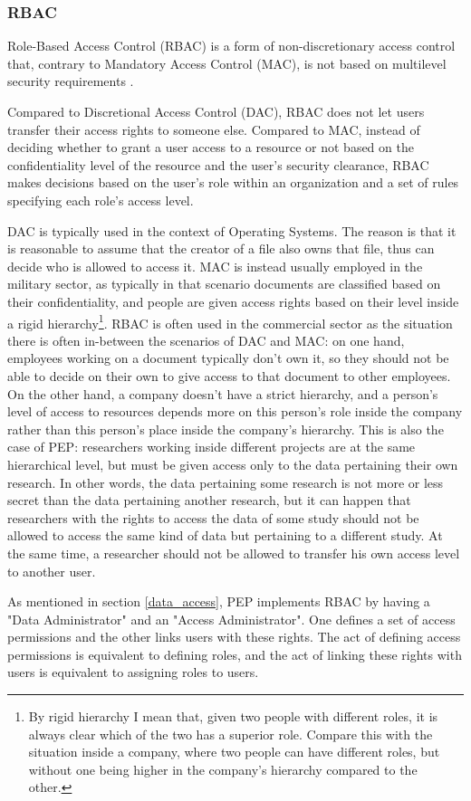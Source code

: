 \documentclass{report}
\begin{document}
\subsubsection{RBAC}
Role-Based Access Control (RBAC) is a form of non-discretionary access control that, contrary to Mandatory Access Control (MAC), is not based on multilevel security requirements \cite{rbac}. \par
Compared to Discretional Access Control (DAC), RBAC does not let users transfer their access rights to someone else. Compared to MAC, instead of deciding whether to grant a user access 
to a resource or not based on the confidentiality level of the resource and the user's security clearance, RBAC makes decisions based on the user's role within an organization and a set 
of rules specifying each role's access level. \par
DAC is typically used in the context of Operating Systems. The reason is that it is reasonable to assume that the creator of a file also owns that file, thus can decide who is
allowed to access it. MAC is instead usually employed in the military sector, as typically in that scenario documents are classified based on their confidentiality, and people are
given access rights based on their level inside a rigid hierarchy\footnote{By rigid hierarchy I mean that, given two people with different roles, it is always clear which of the two 
has a superior role. Compare this with the situation inside a company, where two people can have different roles, but without one being higher in the company's hierarchy compared to
the other.}. RBAC is often used in the commercial sector as the situation there is often in-between the scenarios of DAC and MAC: on one hand, employees working on a document
typically don't own it, so they should not be able to decide on their own to give access to that document to other employees. On the other hand, a company doesn't have a strict
hierarchy, and a person's level of access to resources depends more on this person's role inside the company rather than this person's place inside the company's hierarchy. This is
also the case of PEP: researchers working inside different projects are at the same hierarchical level, but must be given access only to the data pertaining their own research. In
other words, the data pertaining some research is not more or less secret than the data pertaining another research, but it can happen that researchers with the rights to access
the data of some study should not be allowed to access the same kind of data but pertaining to a different study. At the same time, a researcher should not be allowed to transfer his
own access level to another user. \par
As mentioned in section \ref{data_access}, PEP implements RBAC by having a "Data Administrator" and an "Access Administrator". One defines a set of access permissions and the other
links users with these rights. The act of defining access permissions is equivalent to defining roles, and the act of linking these rights with users is equivalent to assigning
roles to users.
\end{document}
